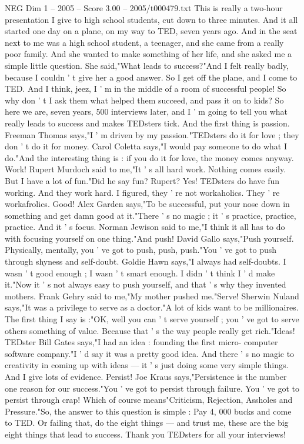 \begin{textsample}{NEG Dim 1 – 2005 – Score 3.00 – 2005/t000479.txt}  \label{ex:f1_neg_075}
This is really a two-hour presentation I give to high school students, cut down to three minutes.
And it all started one day on a plane, on my way to TED, seven years ago.
And in the seat next to me was a high school student, a teenager, and she came from a really poor family.
And she wanted to make something of her life, and she asked me a simple little question.
She said,"What leads to success?"And I felt really badly, because I couldn ' t give her a good answer.
So I get off the plane, and I come to TED.
And I think, jeez, I ' m in the middle of a room of successful people!
So why don ' t I ask them what helped them succeed, and pass it on to kids?
So here we are, seven years, 500 interviews later, and I ' m going to tell you what really leads to success and makes TEDsters tick.
And the first thing is passion.
Freeman Thomas says,"I ' m driven by my passion."TEDsters do it for love ; they don ' t do it for money.
Carol Coletta says,"I would pay someone to do what I do."And the interesting thing is : if you do it for love, the money comes anyway.
Work!
Rupert Murdoch said to me,"It ' s all hard work.
Nothing comes easily.
But I have a lot of fun."Did he say fun?
Rupert?
Yes!
TEDsters do have fun working.
And they work hard.
I figured, they ' re not workaholics.
They ' re workafrolics.
Good!
Alex Garden says,"To be successful, put your nose down in something and get damn good at it."There ' s no magic ; it ' s practice, practice, practice.
And it ' s focus.
Norman Jewison said to me,"I think it all has to do with focusing yourself on one thing."And push!
David Gallo says,"Push yourself.
Physically, mentally, you ' ve got to push, push, push."You ' ve got to push through shyness and self-doubt.
Goldie Hawn says,"I always had self-doubts.
I wasn ' t good enough ; I wasn ' t smart enough.
I didn ' t think I ' d make it."Now it ' s not always easy to push yourself, and that ' s why they invented mothers.
Frank Gehry said to me,"My mother pushed me."Serve!
Sherwin Nuland says,"It was a privilege to serve as a doctor."A lot of kids want to be millionaires.
The first thing I say is :"OK, well you can ' t serve yourself ; you ' ve got to serve others something of value.
Because that ' s the way people really get rich."Ideas!
TEDster Bill Gates says,"I had an idea : founding the first micro- computer software company."I ' d say it was a pretty good idea.
And there ' s no magic to creativity in coming up with ideas — it ' s just doing some very simple things.
And I give lots of evidence.
Persist!
Joe Kraus says,"Persistence is the number one reason for our success."You ' ve got to persist through failure.
You ' ve got to persist through crap!
Which of course means"Criticism, Rejection, Assholes and Pressure."So, the answer to this question is simple : Pay 4, 000 bucks and come to TED.
Or failing that, do the eight things — and trust me, these are the big eight things that lead to success.
Thank you TEDsters for all your interviews!

\end{textsample}
